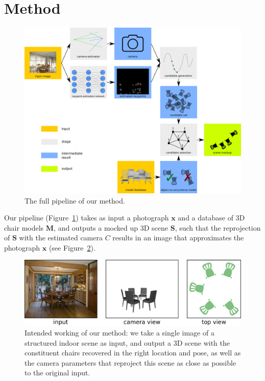 \documentclass[10pt,twocolumn,letterpaper]{article}
\newcommand{\bb}[1]{{\bm{#1}}}
\begin{document}
\section{Method}
\begin{figure}[h!tb]
    \includegraphics[width=\linewidth]{figures/pipeline/pipeline}
    \caption[Pipeline]{The full pipeline of our method.}
    \label{fig:ch4:pipeline}
\end{figure}
Our pipeline (Figure~\ref{fig:ch4:pipeline}) takes as input a photograph $\bb{x}$ and a database of 3D chair models
$\bb{M}$, and outputs a mocked up 3D scene $\bb{S}$, such that the reprojection
of $\bb{S}$ with the  estimated camera $C$ results in an image that approximates the photograph  $\bb{x}$ (see Figure~\ref{fig:ch4:intended_outcome}).

\begin{figure}[t]
    \includegraphics[width=\linewidth]{figures/expected_output/expected_output}
    \caption[Expected output]{Intended working of our method: we take a single image of a structured indoor scene as input, and output a 3D scene with the constituent chairs recovered in the right location and pose, as well as the camera parameters that reproject this scene as close as possible to the original input.}
    \label{fig:ch4:intended_outcome}
\end{figure}
\end{document}
